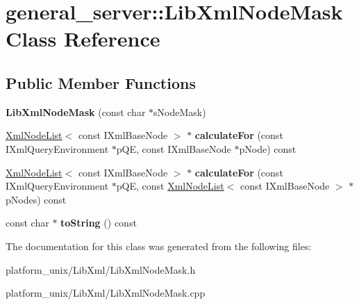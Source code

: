 \hypertarget{classgeneral__server_1_1LibXmlNodeMask}{\section{general\-\_\-server\-:\-:\-Lib\-Xml\-Node\-Mask \-Class \-Reference}
\label{classgeneral__server_1_1LibXmlNodeMask}
}
\subsection*{\-Public \-Member \-Functions}
\begin{DoxyCompactItemize}
\item 
\hypertarget{classgeneral__server_1_1LibXmlNodeMask_a959cae118a6a6c555a718da3ffbe4687}{{\bfseries \-Lib\-Xml\-Node\-Mask} (const char $\ast$s\-Node\-Mask)}\label{classgeneral__server_1_1LibXmlNodeMask_a959cae118a6a6c555a718da3ffbe4687}

\item 
\hypertarget{classgeneral__server_1_1LibXmlNodeMask_add0838f174a5c79ea1a115bc41a5aa0b}{\hyperlink{classgeneral__server_1_1XmlNodeList}{\-Xml\-Node\-List}$<$ const \-I\-Xml\-Base\-Node $>$ $\ast$ {\bfseries calculate\-For} (const \-I\-Xml\-Query\-Environment $\ast$p\-Q\-E, const \-I\-Xml\-Base\-Node $\ast$p\-Node) const }\label{classgeneral__server_1_1LibXmlNodeMask_add0838f174a5c79ea1a115bc41a5aa0b}

\item 
\hypertarget{classgeneral__server_1_1LibXmlNodeMask_a94db4ba536586d63d083d05eea226a81}{\hyperlink{classgeneral__server_1_1XmlNodeList}{\-Xml\-Node\-List}$<$ const \-I\-Xml\-Base\-Node $>$ $\ast$ {\bfseries calculate\-For} (const \-I\-Xml\-Query\-Environment $\ast$p\-Q\-E, const \hyperlink{classgeneral__server_1_1XmlNodeList}{\-Xml\-Node\-List}$<$ const \-I\-Xml\-Base\-Node $>$ $\ast$p\-Nodes) const }\label{classgeneral__server_1_1LibXmlNodeMask_a94db4ba536586d63d083d05eea226a81}

\item 
\hypertarget{classgeneral__server_1_1LibXmlNodeMask_afc89be497796742404365237a2b94435}{const char $\ast$ {\bfseries to\-String} () const }\label{classgeneral__server_1_1LibXmlNodeMask_afc89be497796742404365237a2b94435}

\end{DoxyCompactItemize}


\-The documentation for this class was generated from the following files\-:\begin{DoxyCompactItemize}
\item 
platform\-\_\-unix/\-Lib\-Xml/\-Lib\-Xml\-Node\-Mask.\-h\item 
platform\-\_\-unix/\-Lib\-Xml/\-Lib\-Xml\-Node\-Mask.\-cpp\end{DoxyCompactItemize}
